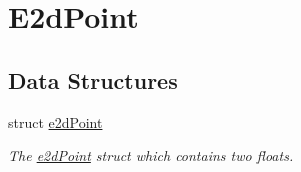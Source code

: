 \hypertarget{group__e2d_point}{\section{E2d\-Point}
\label{group__e2d_point}
}
\subsection*{Data Structures}
\begin{DoxyCompactItemize}
\item 
struct \hyperlink{structe2d_point}{e2d\-Point}
\begin{DoxyCompactList}\small\item\em The \hyperlink{structe2d_point}{e2d\-Point} struct which contains two floats. \end{DoxyCompactList}\end{DoxyCompactItemize}
